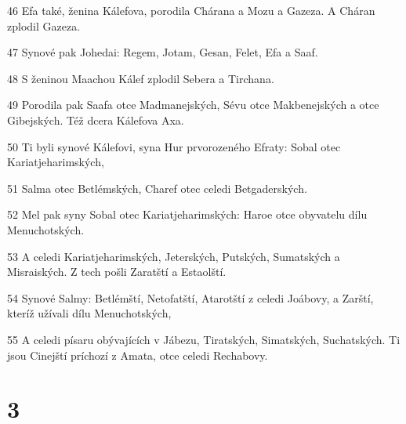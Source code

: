 \par 46 Efa také, ženina Kálefova, porodila Chárana a Mozu a Gazeza. A Cháran zplodil Gazeza.
\par 47 Synové pak Johedai: Regem, Jotam, Gesan, Felet, Efa a Saaf.
\par 48 S ženinou Maachou Kálef zplodil Sebera a Tirchana.
\par 49 Porodila pak Saafa otce Madmanejských, Sévu otce Makbenejských a otce Gibejských. Též dcera Kálefova Axa.
\par 50 Ti byli synové Kálefovi, syna Hur prvorozeného Efraty: Sobal otec Kariatjeharimských,
\par 51 Salma otec Betlémských, Charef otec celedi Betgaderských.
\par 52 Mel pak syny Sobal otec Kariatjeharimských: Haroe otce obyvatelu dílu Menuchotských.
\par 53 A celedi Kariatjeharimských, Jeterských, Putských, Sumatských a Misraiských. Z tech pošli Zaratští a Estaolští.
\par 54 Synové Salmy: Betlémští, Netofatští, Atarotští z celedi Joábovy, a Zarští, kteríž užívali dílu Menuchotských,
\par 55 A celedi písaru obývajících v Jábezu, Tiratských, Simatských, Suchatských. Ti jsou Cinejští príchozí z Amata, otce celedi Rechabovy.

\chapter{3}

